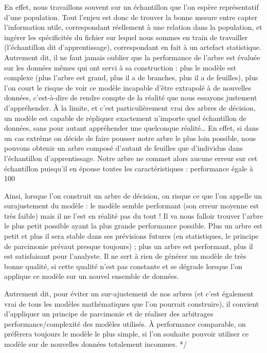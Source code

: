 En effet, nous travaillons souvent sur un échantillon que l'on espère représentatif d’une population. Tout l’enjeu est donc de trouver la bonne mesure entre capter l’information utile, correspondant réellement à une relation dans la population, et ingérer les spécificités du fichier sur lequel nous sommes en train de travailler (l'échantillon dit d'apprentissage), correspondant en fait à un artefact statistique. Autrement dit, il ne faut jamais oublier que la performance de l'arbre est évaluée sur les données mêmes qui ont servi à sa construction : plus le modèle est complexe (plus l'arbre est grand, plus il a de branches, plus il a de feuilles), plus l'on court le risque de voir ce modèle incapable d'être extrapolé à de nouvelles données, c'est-à-dire de rendre compte de la réalité que nous essayons justement d'appréhender. À la limite, et c'est particulièrement vrai des arbres de décision, un modèle est capable de répliquer exactement n'importe quel échantillon de données, sans pour autant appréhender une quelconque réalité… En effet, si dans un cas extrême on décide de faire pousser notre arbre le plus loin possible, nous pouvons obtenir un arbre composé d'autant de feuilles que d'individus dans l'échantillon d'apprentissage. Notre arbre ne commet alors aucune erreur sur cet échantillon puisqu'il en épouse toutes les caractéristiques : performance égale à 100 %

Ainsi, lorsque l'on construit un arbre de décision, on risque ce que l'on appelle un surajustement du modèle : le modèle semble performant (son erreur moyenne est très faible) mais il ne l'est en réalité pas du tout ! Il va nous falloir trouver l'arbre le plus petit possible ayant la plus grande performance possible. Plus un arbre est petit et plus il sera stable dans ses prévisions futures (en statistiques, le principe de parcimonie prévaut presque toujours) ; plus un arbre est performant, plus il est satisfaisant pour l'analyste. Il ne sert à rien de générer un modèle de très bonne qualité, si cette qualité n’est pas constante et se dégrade lorsque l’on applique ce modèle sur un nouvel ensemble de données.

Autrement dit, pour éviter un sur-ajustement de nos arbres (et c'est également vrai de tous les modèles mathématiques que l'on pourrait construire), il convient d'appliquer un principe de parcimonie et de réaliser des arbitrages performance/complexité des modèles utilisés. À performance comparable, on préfèrera toujours le modèle le plus simple, si l'on souhaite pouvoir utiliser ce modèle sur de nouvelles données totalement inconnues.
*/


